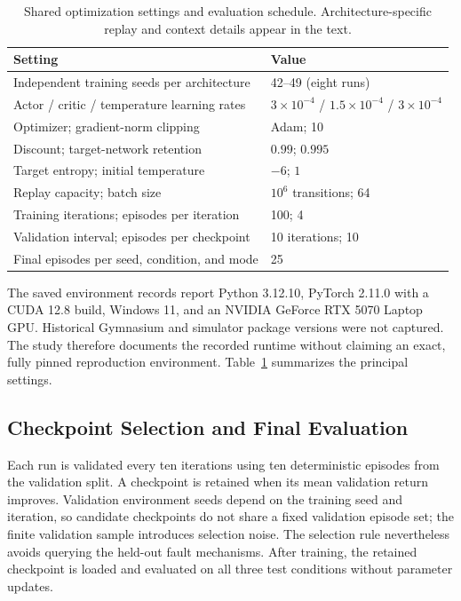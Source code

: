 \documentclass[runningheads]{llncs}
\begin{document}
\begin{table}[t]
\caption{Shared optimization settings and evaluation schedule. Architecture-specific replay and context details appear in the text.}
\label{tab:settings}
\centering\small
\begin{tabular}{@{}ll@{}}
\toprule
Setting & Value \\
\midrule
Independent training seeds per architecture & 42--49 (eight runs) \\
Actor / critic / temperature learning rates & $3\times10^{-4}$ / $1.5\times10^{-4}$ / $3\times10^{-4}$ \\
Optimizer; gradient-norm clipping & Adam; 10 \\
Discount; target-network retention & $0.99$; $0.995$ \\
Target entropy; initial temperature & $-6$; $1$ \\
Replay capacity; batch size & $10^6$ transitions; 64 \\
Training iterations; episodes per iteration & 100; 4 \\
Validation interval; episodes per checkpoint & 10 iterations; 10 \\
Final episodes per seed, condition, and mode & 25 \\
\bottomrule
\end{tabular}
\end{table}

The saved environment records report Python 3.12.10, PyTorch 2.11.0 with a CUDA 12.8 build, Windows 11, and an NVIDIA GeForce RTX 5070 Laptop GPU. Historical Gymnasium and simulator package versions were not captured. The study therefore documents the recorded runtime without claiming an exact, fully pinned reproduction environment. Table~\ref{tab:settings} summarizes the principal settings.

\subsection{Checkpoint Selection and Final Evaluation}
Each run is validated every ten iterations using ten deterministic episodes from the validation split. A checkpoint is retained when its mean validation return improves. Validation environment seeds depend on the training seed and iteration, so candidate checkpoints do not share a fixed validation episode set; the finite validation sample introduces selection noise. The selection rule nevertheless avoids querying the held-out fault mechanisms. After training, the retained checkpoint is loaded and evaluated on all three test conditions without parameter updates.
\end{document}
